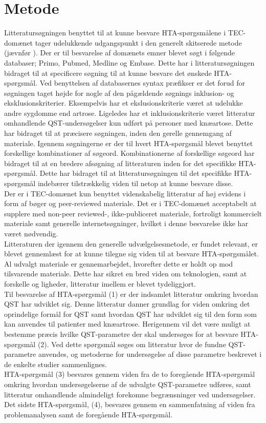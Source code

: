 \section{Metode}
Litteratursøgningen benyttet til at kunne besvare HTA-spørgsmålene i TEC-domænet tager udelukkende udgangspunkt i den generelt skitserede metode (jævnfør ). Der er til besvarelse af domænets emner blevet søgt i følgende databaser; Primo, Pubmed, Medline og Embase. Dette har i litteratursøgningen bidraget til at specificere søgning til at kunne besvare det ønskede HTA-spørgsmål. Ved benyttelsen af databasernes syntax præfikser er det forud for søgningen taget højde for nogle af den pågældende søgnings inklusion- og eksklusionskriterier. Eksempelvis har et ekslusionskriterie været at udelukke andre sygdomme end artrose. Ligeledes har et inklusionskriterie været litteratur omhandlende QST-undersøgelser kun udført på personer med knæartose.  Dette har bidraget til at præcisere søgningen, inden den gerelle gennemgang af materiale. Igennem søgningerne er der til hvert HTA-spørgsmål blevet benyttet forskellige kombinationer af søgeord. Kombinationerne af forskellige søgeord har bidraget til at en bredere afsøgning af litteraturen inden for det specifikke HTA-spørgsmål. Dette har bidraget til at litteratursøgningen til det specifikke HTA-spørgsmål indebærer tilstrækkelig viden til netop at kunne besvare disse. \\
Der er i TEC-domænet kun benyttet videnskabelig litteratur af høj evidens i form af bøger og peer-reviewed materiale. Det er i TEC-domænet acceptabelt at supplere med non-peer reviewed-, ikke-publiceret materiale, fortroligt kommercielt materiale samt generelle internetsøgninger, hvilket i denne besvarelse ikke har været nødvendig. \citep{HTAcore} \\
Litteraturen der igennem den generelle udvælgelsesmetode, er fundet relevant, er blevet gennemlæst for at kunne tilegne sig viden til at besvare HTA-spørgsmålet. Al udvalgt materiale er gennemarbejdet, hvorefter dette er holdt op mod tilsvarende materiale. Dette har sikret en bred viden om teknologien, samt at forskelle og ligheder, litteratur imellem er blevet tydeliggjort. \\
Til besvarelse af HTA-spørgsmål (1) er der indsamlet litteratur omkring hvordan QST har udviklet sig. Denne litteratur danner grundlag for viden omkring det oprindelige formål for QST samt hvordan QST har udviklet sig til den form som kan anvendes til patienter med knæartrose. Herigennem vil det være muligt at bestemme præcis hvilke QST-parametre der skal undersøges for at besvare HTA-spørgsmål (2). Ved dette spørgsmål søges om litteratur hvor de fundne QST-parametre anvendes, og metoderne for undersøgelse af disse parametre beskrevet i de enkelte studier sammenlignes. \\
HTA-spørgsmål (3) besvares gennem viden fra de to foregående HTA-spørgsmål omkring hvordan undersøgelserne af de udvalgte QST-parametre udføres, samt litteratur omhandlende almindeligt forekomne begrænsninger ved undersøgelser. Det sidste HTA-spørgsmål, (4), besvares gennem en sammenfatning af viden fra problemanalysen samt de foregående HTA-spørgsmål.    
 

